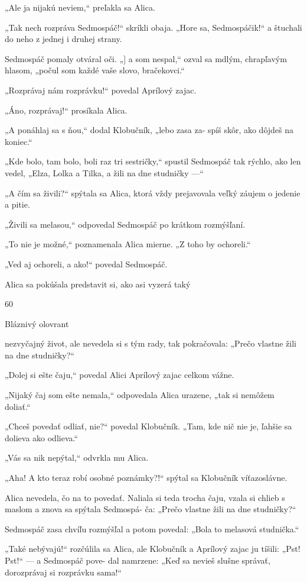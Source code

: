 \documentclass[12pt]{book}
\begin{document}
\begin{Parallel}[p]{}{}
{„Ale ja nijakú neviem,“ preľakla sa Alica.

„Tak nech rozpráva Sedmospáč!“ skríkli obaja. „Hore
sa, Sedmospáčik!“ a štuchali do neho z jednej i druhej
strany.

Sedmospáč pomaly otváral oči. „] a som nespal,“ ozval sa
mdlým, chrapľavým hlasom, „počul som každé vaše slovo,
bračekovci.“

„Rozprávaj nám rozprávku!“ povedal Aprílový zajac.

„Áno, rozprávaj!“ prosíkala Alica.

„A ponáhlaj sa s ňou,“ dodal Klobučník, „lebo zasa za-
spíš skôr, ako dôjdeš na koniec.“

„Kde bolo, tam bolo, boli raz tri sestričky,“ spustil
Sedmospáč tak rýchlo, ako len vedel, „Elza, Lolka a Tilka,
a žili na dne studničky —“

„A čím sa živili?“ spýtala sa Alica, ktorá vždy prejavovala
veľký záujem o jedenie a pitie.

„Živili sa melasou,“ odpovedal Sedmospáč po krátkom
rozmýšľaní.

„To nie je možné,“ poznamenala Alica mierne. „Z toho
by ochoreli.“

„Ved aj ochoreli, a ako!“ povedal Sedmospáč.

Alica sa pokúšala predstavit si, ako asi vyzerá taký

60

Bláznivý olovrant

nezvyčajný život, ale nevedela si
s tým rady, tak pokračovala: „Prečo
vlastne žili na dne studničky?“

„Dolej si ešte čaju,“ povedal Alici
Aprílový zajac celkom vážne.

„Nijaký čaj som ešte nemala,“
odpovedala Alica urazene, „tak si nemôžem doliať.“

„Chceš povedať odliať, nie?“ povedal Klobučník. „Tam,
kde nič nie je, ľahšie sa dolieva ako odlieva.“

„Vás sa nik nepýtal,“ odvrkla mu Alica.

„Aha! A kto teraz robí osobné poznámky?!“ spýtal sa
Klobučník víťazoslávne.

Alica nevedela, čo na to povedať. Naliala si teda trocha
čaju, vzala si chlieb s maslom a znova sa spýtala Sedmospá-
ča: „Prečo vlastne žili na dne studničky?“

Sedmospáč zasa chvíľu rozmýšľal a potom povedal: „Bola
to melasová studnička.“

„Také nebývajú!“ rozčúlila sa Alica, ale Klobučník
a Aprílový zajac ju tíšili: „Pst! Pst!“ — a Sedmospáč pove-
dal namrzene: „Keď sa nevieš slušne správať, dorozprávaj
si rozprávku sama!“

}
\end{Parallel}
\end{document}
